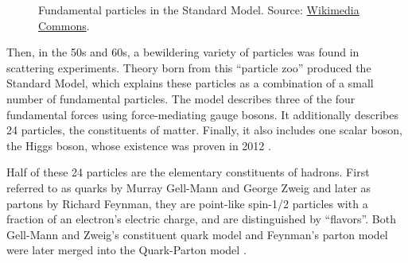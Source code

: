     \begin{figure}[b!]
        \centering{}
        \caption[The standard model.]{Fundamental particles in the Standard Model.
        Source: \hyperlink{https://commons.wikimedia.org/wiki/Main_Page}{Wikimedia Commons}.}
        \label{fig::parts_std_model}
    \end{figure}

    Then, in the 50s and 60s, a bewildering variety of particles was found in scattering experiments.
    Theory born from this ``particle zoo'' produced the Standard Model, which explains these particles as a combination of a small number of fundamental particles.
    The model describes three of the four fundamental forces using force-mediating gauge bosons.
    It additionally describes 24 particles, the constituents of matter.
    Finally, it also includes one scalar boson, the Higgs boson, whose existence was proven in 2012 \cite{aad2012}.

    Half of these 24 particles are the elementary constituents of hadrons.
    First referred to as quarks by Murray Gell-Mann and George Zweig and later as partons by Richard Feynman, they are point-like spin-1/2 particles with a fraction of an electron's electric charge, and are distinguished by ``flavors''.
    Both Gell-Mann and Zweig's constituent quark model and Feynman's parton model were later merged into the Quark-Parton model \cite{perkins2000}.

